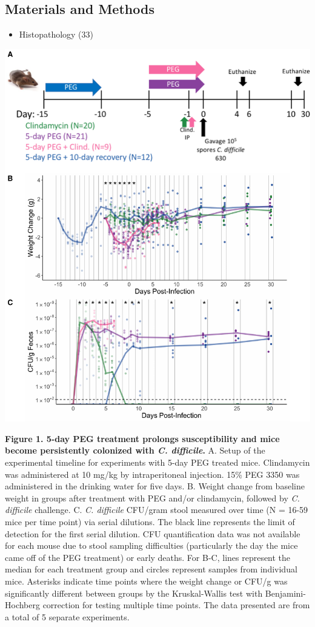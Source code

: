 \documentclass[
  11pt,
]{article}
\providecommand{\tightlist}{%
  \setlength{\itemsep}{0pt}\setlength{\parskip}{0pt}}
\begin{document}
\hypertarget{materials-and-methods}{%
\subsection{Materials and Methods}\label{materials-and-methods}}

\begin{itemize}
\tightlist
\item
  Histopathology (33)
\end{itemize}

\newpage

\includegraphics{figure_1.pdf}

\textbf{Figure 1. 5-day PEG treatment prolongs susceptibility and mice
become persistently colonized with \emph{C. difficile}.} A. Setup of the
experimental timeline for experiments with 5-day PEG treated mice.
Clindamycin was administered at 10 mg/kg by intraperitoneal injection.
15\% PEG 3350 was administered in the drinking water for five days. B.
Weight change from baseline weight in groups after treatment with PEG
and/or clindamycin, followed by \emph{C. difficile} challenge. C.
\emph{C. difficile} CFU/gram stool measured over time (N = 16-59 mice
per time point) via serial dilutions. The black line represents the
limit of detection for the first serial dilution. CFU quantification
data was not available for each mouse due to stool sampling difficulties
(particularly the day the mice came off of the PEG treatment) or early
deaths. For B-C, lines represent the median for each treatment group and
circles represent samples from individual mice. Asterisks indicate time
points where the weight change or CFU/g was significantly different
between groups by the Kruskal-Wallis test with Benjamini-Hochberg
correction for testing multiple time points. The data presented are from
a total of 5 separate experiments. \newpage
\end{document}
